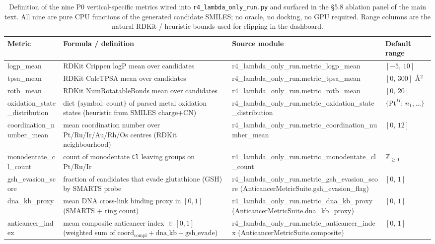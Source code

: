 \begin{table}[h]
\centering
\small
\begin{tabular}{p{3.5cm}p{5.5cm}p{3.0cm}p{1.6cm}}
\hline
\textbf{Metric} & \textbf{Formula / definition} & \textbf{Source module} & \textbf{Default range} \\
\hline
logp\_mean                         & RDKit Crippen logP mean over candidates                                                              & r4\_lambda\_only\_run.metric\_logp\_mean              & $[-5,\, 10]$        \\
tpsa\_mean                         & RDKit CalcTPSA mean over candidates                                                                  & r4\_lambda\_only\_run.metric\_tpsa\_mean              & $[0,\, 300]$ \AA$^2$ \\
rotb\_mean                         & RDKit NumRotatableBonds mean over candidates                                                         & r4\_lambda\_only\_run.metric\_rotb\_mean              & $[0,\, 20]$         \\
oxidation\_state\_distribution     & dict $\{\text{symbol: count}\}$ of parsed metal oxidation states (heuristic from SMILES charge+CN)    & r4\_lambda\_only\_run.metric\_oxidation\_state\_distribution & $\{\text{Pt}^{II}{:}\,n_1, \ldots\}$ \\
coordination\_number\_mean         & mean coordination number over Pt/Ru/Ir/Au/Rh/Os centres (RDKit neighbourhood)                       & r4\_lambda\_only\_run.metric\_coordination\_number\_mean & $[0,\, 12]$         \\
monodentate\_cl\_count             & count of monodentate \texttt{Cl} leaving groups on Pt/Ru/Ir                                          & r4\_lambda\_only\_run.metric\_monodentate\_cl\_count  & $\mathbb{Z}_{\geq 0}$ \\
gsh\_evasion\_score                & fraction of candidates that evade glutathione (GSH) by SMARTS probe                                  & r4\_lambda\_only\_run.metric\_gsh\_evasion\_score (AnticancerMetricSuite.gsh\_evasion\_flag) & $[0,\, 1]$ \\
dna\_kb\_proxy                     & mean DNA cross-link binding proxy in $[0,1]$ (SMARTS + ring count)                                   & r4\_lambda\_only\_run.metric\_dna\_kb\_proxy (AnticancerMetricSuite.dna\_kb\_proxy) & $[0,\, 1]$ \\
anticancer\_index                  & mean composite anticancer index $\in [0,1]$ (weighted sum of $\text{coord}_{\text{compl}} + \text{dna\_kb} + \text{gsh\_evade}$) & r4\_lambda\_only\_run.metric\_anticancer\_index (AnticancerMetricSuite.composite) & $[0,\, 1]$ \\
\hline
\end{tabular}
\caption{Definition of the nine P0 vertical-specific metrics wired into
\texttt{r4\_lambda\_only\_run.py} and surfaced in the §5.8 ablation
panel of the main text.  All nine are pure CPU functions of the
generated candidate SMILES; no oracle, no docking, no GPU required.
Range columns are the natural RDKit / heuristic bounds used for
clipping in the dashboard.}
\label{tab:s11-vertical-metrics}
\end{table}

